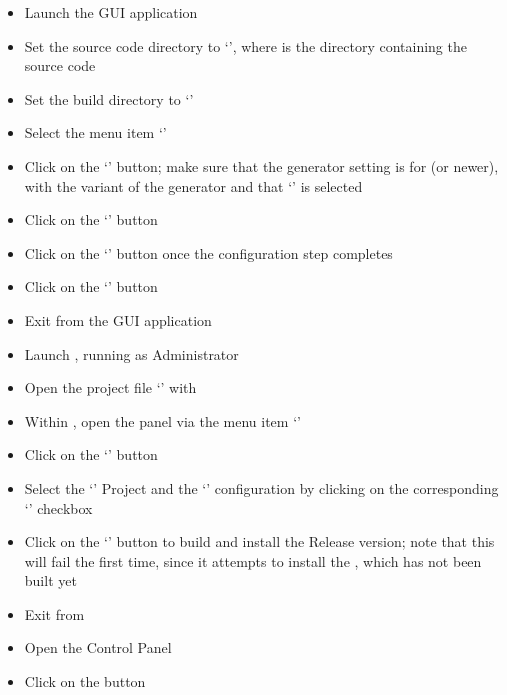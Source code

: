 \begin{itemize}
\item Launch the  GUI application
\item\exSp{}Set the source code directory to
`', where 
is the directory containing the \mplusm{} source code
\item\exSp{}Set the build directory to
`'
\item\exSp{}Select the menu item `'
\item\exSp{}Click on the `' button; make sure that the generator
setting is for  (or newer), with the  variant of
the generator and that `' is selected
\item\exSp{}Click on the `' button
\item\exSp{}Click on the `' button once the configuration step
completes
\item\exSp{}Click on the `' button
\item\exSp{}Exit from the  GUI application
\item\exSp{}Launch , running as Administrator
\item\exSp{}Open the project file
`' with
\item\exSp{}Within , open the  panel via the
menu item `'
\item\exSp{}Click on the `' button
\item\exSp{}Select the `' Project and the `'
configuration by clicking on the corresponding `' checkbox
\item\exSp{}Click on the `' button to build and install the Release
version; note that this will fail the first time, since it attempts to install the
\textit{\MMMU}, which has not been built yet
\item\exSp{}Exit from 
\item\exSp{}Open the  Control Panel
\item\exSp{}Click on the  button

\end{itemize}
